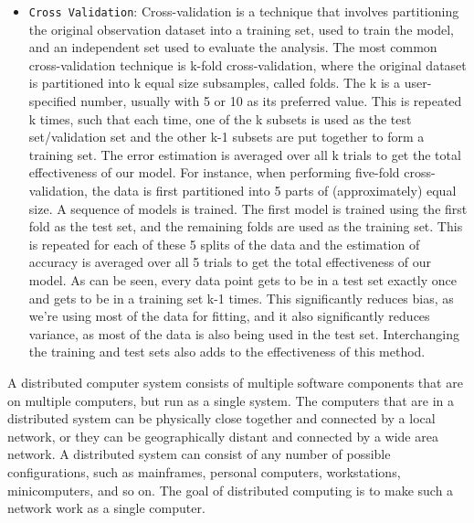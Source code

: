 \documentclass[12pt]{article}
\begin{document}
\begin{itemize}
\item
\texttt{Cross Validation}: Cross-validation is a technique that involves partitioning the original observation dataset into a training set, used to train the model, and an independent set used to evaluate the analysis. The most common cross-validation technique is k-fold cross-validation, where the original dataset is partitioned into k equal size subsamples, called folds. The k is a user-specified number, usually with 5 or 10 as its preferred value. This is repeated k times, such that each time, one of the k subsets is used as the test set/validation set and the other k-1 subsets are put together to form a training set. The error estimation is averaged over all k trials to get the total effectiveness of our model. For instance, when performing five-fold cross-validation, the data is first partitioned into 5 parts of (approximately) equal size. A sequence of models is trained. The first model is trained using the first fold as the test set, and the remaining folds are used as the training set. This is repeated for each of these 5 splits of the data and the estimation of accuracy is averaged over all 5 trials to get the total effectiveness of our model. As can be seen, every data point gets to be in a test set exactly once and gets to be in a training set k-1 times. This significantly reduces bias, as we’re using most of the data for fitting, and it also significantly reduces variance, as most of the data is also being used in the test set. Interchanging the training and test sets also adds to the effectiveness of this method.

\end{itemize}

A distributed computer system consists of multiple software components that are on multiple computers, but run as a single system. The computers that are in a distributed system can be physically close together and connected by a local network, or they can be geographically distant and connected by a wide area network. A distributed system can consist of any number of possible configurations, such as mainframes, personal computers, workstations, minicomputers, and so on. The goal of distributed computing is to make such a network work as a single computer.
\end{document}
